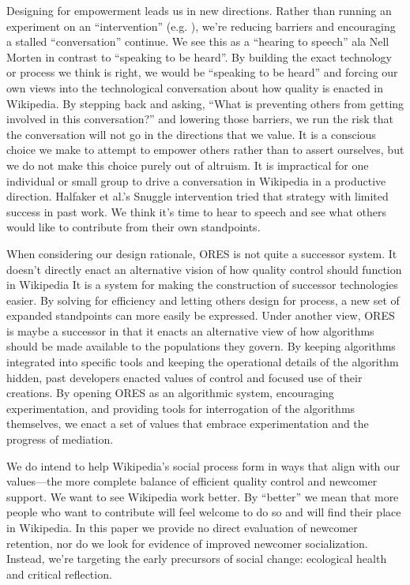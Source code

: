 Designing for empowerment leads us in new directions.  Rather than running an experiment on an ``intervention'' (e.g. \cite{halfaker2014snuggle}), we're reducing barriers and encouraging a stalled ``conversation'' continue.  We see this as a ``hearing to speech'' ala Nell Morten\cite{morton1985journey} in contrast to ``speaking to be heard''.  By building the exact technology or process we think is right, we would be ``speaking to be heard'' and forcing our own views into the technological conversation about how quality is enacted in Wikipedia.  By stepping back and asking, ``What is preventing others from getting involved in this conversation?'' and lowering those barriers, we run the risk that the conversation will not go in the directions that we value.  It is a conscious choice we make to attempt to empower others rather than to assert ourselves, but we do not make this choice purely out of altruism.  It is impractical for one individual or small group to drive a conversation in Wikipedia in a productive direction.  Halfaker et al.'s Snuggle intervention\cite{halfaker2014snuggle} tried that strategy with limited success in past work.  We think it's time to hear to speech and see what others would like to contribute from their own standpoints.

When considering our design rationale, ORES is not quite a successor system.  It doesn't directly enact an alternative vision of how quality control should function in Wikipedia  It is a system for making the construction of successor technologies easier.  By solving for efficiency and letting others design for process, a new set of expanded standpoints can more easily be expressed.  Under another view, ORES is maybe a successor in that it enacts an alternative view of how algorithms should be made available to the populations they govern.  By keeping algorithms integrated into specific tools and keeping the operational details of the algorithm hidden, past developers enacted values of control and focused use of their creations.  By opening ORES as an algorithmic system, encouraging experimentation, and providing tools for interrogation of the algorithms themselves, we enact a set of values that embrace experimentation and the progress of mediation.

We do intend to help Wikipedia's social process form in ways that align with our values---the more complete balance of efficient quality control and newcomer support.  We want to see Wikipedia work better. By ``better'' we mean that more people who want to contribute will feel welcome to do so and will find their place in Wikipedia.  In this paper we provide no direct evaluation of newcomer retention, nor do we look for evidence of improved newcomer socialization.  Instead, we're targeting the early precursors of social change: ecological health and critical reflection.  

